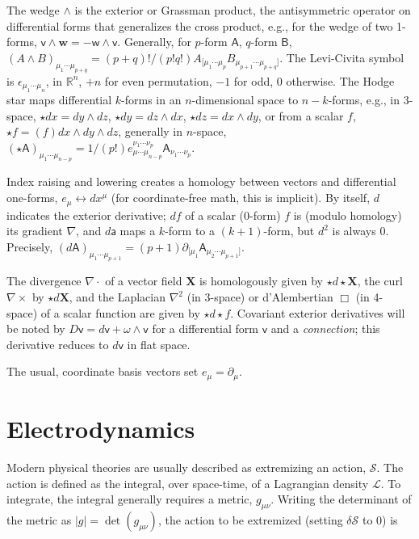 The wedge $\wedge$ is the exterior or Grassman product, the antisymmetric operator on differential forms that generalizes the cross product, e.g., for the wedge of two 1-forms, $\textsf{v} \wedge \textbf{w} = -\textsf{w} \wedge \textsf{v}$.
Generally, for $p$-form $\textsf{A}$, $q$-form $\textsf{B}$, $(A \wedge B)_{\mu_1 \cdots \mu_{p+q}} = (p+q)!/(p!q!) A_{[\mu_1\cdots\mu_p} B_{\mu_{p+1} \cdots \mu_{p+q} ]}$. 
The Levi-Civita symbol is $\epsilon_{\mu_1 \cdots \mu_n}$, in $\mathbb{R}^n$, $+n$ for even permutation, $-1$ for odd, $0$ otherwise.
The Hodge star maps differential $k$-forms in an $n$-dimensional space to $n-k$-forms, e.g., in 3-space, $\star dx = dy \wedge dz$, $\star dy = dz \wedge dx$, $\star dz = dx \wedge dy$, or from a scalar $f$, $\star f = (f) dx \wedge dy \wedge dz$, generally in $n$-space, $(\star \textsf{A})_{\mu_1 \cdots \mu_{n-p}} = 1/(p!) e^{\nu_1 \cdots \nu_p}_{\mu \cdots \mu_{n-p}} \textsf{A}_{\nu_1 \cdots \nu_p}$.

Index raising and lowering creates a homology between vectors and differential one-forms, $e_\mu \leftrightarrow dx^\mu$ (for coordinate-free math, this is implicit).
By itself, $d$ indicates the exterior derivative; $df$ of a scalar (0-form) $f$ is (modulo homology) its gradient $\nabla$, and $d\textsf{a}$ maps a $k$-form to a $(k+1)$-form, but $d^2$ is always 0.
Precisely, $(d\textsf{A})_{\mu_1 \cdots \mu_{p+1}} = (p+1) \partial_{[\mu_1} \textsf{A}_{\mu_2 \cdots \mu_{p+1}]}$. 


The divergence $\nabla \cdot$ of a vector field $\textbf{X}$ is homologously given by $\star d \star \textbf{X}$, the curl $\nabla \times$ by $\star d \textbf{X}$, and the Laplacian $\nabla^2$ (in 3-space) or d'Alembertian $\Box$ (in 4-space) of a scalar function are given by $\star d \star f$.
Covariant exterior derivatives will be noted by $D \textsf{v} = d \textsf{v} + \omega \wedge \textsf{v}$ for a differential form $\textsf{v}$ and a \textit{connection}; this derivative reduces to $d\textsf{v}$ in flat space.

The usual, coordinate basis vectors set $e_\mu = \partial_\mu$.

\section{Electrodynamics}

Modern physical theories are usually described as extremizing an action, $\mathcal{S}$. 
The action is defined as the integral, over space-time, of a Lagrangian density $\mathcal{L}$. 
To integrate, the integral generally requires a metric, $g_{\mu\nu}$.
Writing the determinant of the metric as $|g| = \det(g_{\mu\nu})$, the action to be extremized (setting $\delta \mathcal{S}$ to 0) is

